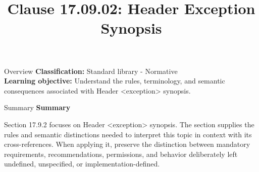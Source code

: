 \documentclass[10pt,letterpaper]{article}
\title{Clause 17.09.02: Header Exception Synopsis}
\author{}
\date{}
\begin{document}
\maketitle
\begin{CornellOverviewBox}{Overview}
\textbf{Classification:} Standard library - Normative\\[2pt]
\textbf{Learning objective:} Understand the rules, terminology, and semantic consequences associated with Header <exception> synopsis.
\end{CornellOverviewBox}\begin{CornellSummaryBox}{Summary}
{\sffamily\bfseries\color{Accent} Summary}\par\vspace{3pt}Section 17.9.2 focuses on Header <exception> synopsis. The section supplies the rules and semantic distinctions needed to interpret this topic in context with its cross-references. When applying it, preserve the distinction between mandatory requirements, recommendations, permissions, and behavior deliberately left undefined, unspecified, or implementation-defined.
\end{CornellSummaryBox}
\end{document}
